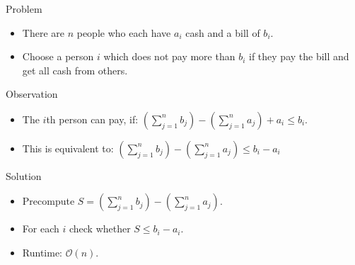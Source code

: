 \begin{frame}
    \frametitle{\problemtitle}
    \begin{block}{Problem}
        \begin{itemize}
            \item There are $n$ people who each have $a_i$ cash and a bill of $b_i$.
            \item Choose a person $i$ which does not pay more than $b_i$ if they pay the bill and get all cash from others.

        \end{itemize}
    \end{block}
    \pause
    \begin{block}{Observation}
        \begin{itemize}
            \item The $i$th person can pay, if: $(\sum_{j = 1}^n b_j) - (\sum_{j = 1}^n a_j) + a_i \leq b_i$.
            \item This is equivalent to: $(\sum_{j = 1}^n b_j) - (\sum_{j = 1}^n a_j) \leq b_i - a_i$
        \end{itemize}
    \end{block}
    \pause
    \begin{block}{Solution}
        \begin{itemize}
            \item Precompute $S = (\sum_{j = 1}^n b_j) - (\sum_{j = 1}^n a_j)$.
        \item For each $i$ check whether $S \leq b_i - a_i$.
        \item Runtime: $\mathcal{O}(n)$.
        \end{itemize}
    \end{block}
    \pause
    \solvestats
\end{frame}
